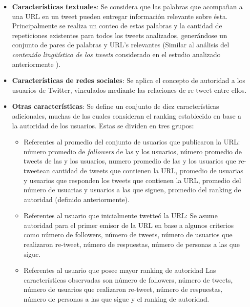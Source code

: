 \begin{itemize}
	\item \textbf{Características textuales}: Se considera que las palabras que acompañan a una URL en un tweet pueden entregar información relevante sobre ésta. Principalmente se realiza un conteo de estas palabras y la cantidad de repeticiones existentes para todos los tweets analizados, generándose un conjunto de pares de palabras y URL's relevantes (Similar al análisis del \emph{contenido lingüístico de los tweets} considerado en el estudio analizado anteriormente \cite{PennacchiottiP11}).
	
	\item \textbf{Características de redes sociales}: Se aplica el concepto de autoridad a los usuarios de Twitter, vinculados mediante las relaciones de re-tweet entre ellos.
	
	\item \textbf{Otras características}: Se define un conjunto de diez características adicionales, muchas de las cuales consideran el ranking establecido en base a la autoridad de los usuarios. Estas se dividen en tres grupos:
		\begin{itemize}
		\item{Referentes al promedio del conjunto de usuarios que publicaron la URL}: número promedio de \emph{followers} de las y los usuarios, número promedio de tweets de las y los usuarios, numero promedio de las y los usuarios que re-tweetean cantidad de tweets que contienen la URL, promedio de usuarias y usuarios que responden los tweets que contienen la URL, promedio del número de usuarias y usuarios a las que siguen, promedio del ranking de autoridad (definido anteriormente).
		\item{Referentes al usuario que inicialmente twetteó la URL}: Se asume autoridad para el primer emisor de la URL en base a algunos criterios como número de followers, número de tweets, número de usuarios que realizaron re-tweet, número de respuestas, número de personas a las que sigue.
		\item{Referentes al usuario que posee mayor ranking de autoridad} Las características observadas son número de followers, número de tweets, número de usuarios que realizaron re-tweet, número de respuestas, número de personas a las que sigue y el ranking de autoridad.
		\end{itemize}
\end{itemize}
	

